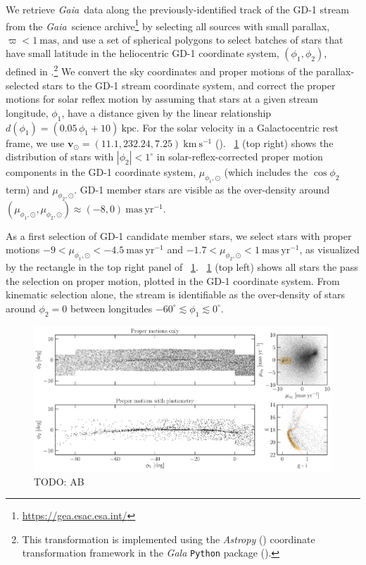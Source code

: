 \documentclass[modern]{aastex62}
\newcommand{\package}[1]{\textsl{#1}}
\newcommand{\gaia}{\textsl{Gaia}}
\newcommand{\kms}{\ensuremath{\textrm{km}~\textrm{s}^{-1}}}
\newcommand{\bs}[1]{\boldsymbol{#1}}
\newcommand{\masyr}{\ensuremath{\textrm{mas}~\textrm{yr}^{-1}}}
\newcommand{\todo}[1]{{\color{red} TODO: #1}}
\begin{document}
We retrieve \gaia\ data along the previously-identified track of the GD-1 stream
from the \gaia\ science archive\footnote{\url{https://gea.esac.esa.int/}} by
selecting all sources with small parallax, $\varpi < 1~\textrm{mas}$, and use a
set of spherical polygons to select batches of stars that have small latitude in
the heliocentric GD-1 coordinate system, $(\phi_1, \phi_2)$, defined in
\cite{Koposov:2010}.\footnote{This transformation is implemented using the
\package{Astropy} (\citealt{astropy}) coordinate transformation framework in the
\package{Gala} \texttt{Python} package (\citealt{gala}).}
We convert the sky coordinates and proper motions of the parallax-selected stars
to the GD-1 stream coordinate system, and correct the proper motions for solar
reflex motion by assuming that stars at a given stream longitude, $\phi_1$, have
a distance given by the linear relationship $d(\phi_1) = (0.05 \, \phi_1 +
10)~\textrm{kpc}$.
For the solar velocity in a Galactocentric rest frame, we use $\bs{v}_\odot =
(11.1, 232.24, 7.25)~\kms$ (\citealt{Schonrich:2010, Bovy:2015}).
\figurename~\ref{fig:selection} (top right) shows the distribution of stars with
$|\phi_2| < 1^\circ$ in solar-reflex-corrected proper motion components in the
GD-1 coordinate system, $\mu_{\phi_1, \odot}$ (which includes the $\cos{\phi_2}$
term) and $\mu_{\phi_2, \odot}$.
GD-1 member stars are visible as the over-density around
$(\mu_{\phi_1, \odot}, \mu_{\phi_2, \odot}) \approx (-8, 0)~\masyr$.

As a first selection of GD-1 candidate member stars, we select stars with proper
motions $-9 < \mu_{\phi_1, \odot} < -4.5~\masyr$ and $-1.7 < \mu_{\phi_2, \odot}
< 1~\masyr$, as visualized by the rectangle in the top right panel of
\figurename~\ref{fig:selection}.
\figurename~\ref{fig:selection} (top left) shows all stars the pass the
selection on proper motion, plotted in the GD-1 coordinate system.
From kinematic selection alone, the stream is identifiable as the over-density
of stars around $\phi_2 = 0$ between longitudes $-60^\circ \lesssim \phi_1
\lesssim 0^\circ$.

\begin{figure}[h]
\begin{center}
\includegraphics[width=\textwidth]{gd1_sample.pdf}
\end{center}
\caption{
    \todo{AB}
\label{fig:selection}
}
\end{figure}
\end{document}
